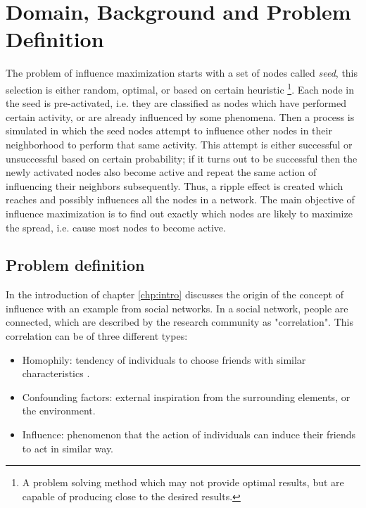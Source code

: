 \chapter{Domain, Background and Problem Definition}
\label{chp:domain}

The problem of influence maximization starts with a set of nodes called \textit{seed}, this selection is either random, optimal, or based on certain heuristic \footnote{A problem solving method which may not provide optimal results, but are capable of producing close to the desired results.}. Each node in the seed is pre-activated, i.e. they are classified as nodes which have performed certain activity, or are already influenced by some phenomena. Then a process is simulated in which the seed nodes attempt to influence other nodes in their neighborhood to perform that same activity. This attempt is either successful or unsuccessful based on certain probability; if it turns out to be successful then the newly activated nodes also become active and repeat the same action of influencing their neighbors subsequently. Thus, a ripple effect is created which reaches and possibly influences all the nodes in a network. The main objective of influence maximization is to find out exactly which nodes are likely to maximize the spread, i.e. cause most nodes to become active.

	\section{Problem definition}
	\label{sec:domain-problem}
	In the introduction of chapter \ref{chp:intro} discusses the origin of the concept of influence with an example from social networks. In a social network, people are connected, which are described by the research community as "correlation". This correlation can be of three different types:
	
	\begin{itemize}
		\item Homophily: tendency of individuals to choose friends with similar characteristics \cite{mcpherson2001}.
		
		\item Confounding factors: external inspiration from the surrounding elements, or the environment.
		
		\item Influence: phenomenon that the action of individuals can induce their friends to act in similar way.
	\end{itemize}
	
